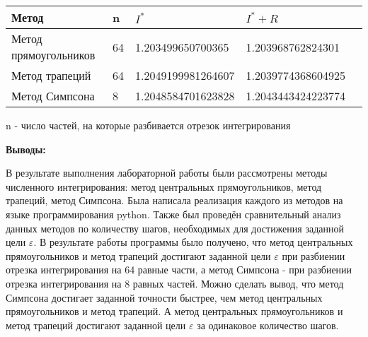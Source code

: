 \documentclass [12pt]{article}
\begin{document}
\begin{center}
\begin{tabular}{|l|l|l|l|l|}
    \hline
    Метод & n & $I^*$ & $I^* + R$\\
    \hline
    Метод прямоугольников & 64 & 1.203499650700365 & 1.203968762824301 \\
    \hline
    Метод трапеций & 64 & 1.2049199981264607 & 1.2039774368604925 \\
    \hline
    Метод Симпсона & 8 & 1.2048584701623828 & 1.2043443424223774 \\
    \hline
\end{tabular}
\end{center}

n - число частей, на которые разбивается отрезок интегрирования

\textbf{Выводы:}

В результате выполнения лабораторной работы были рассмотрены методы численного интегрирования: метод центральных прямоугольников, метод трапеций, метод Симпсона. Была написала реализация каждого из методов на языке программирования python. Также был проведён сравнительный анализ данных методов по количеству шагов, необходимых для достижения заданной цели $\varepsilon$.
В результате работы программы было получено, что метод центральных прямоугольников и метод трапеций достигают заданной цели $\varepsilon$ при разбиении отрезка интегрирования на 64 равные части, а метод Симпсона - при разбиении отрезка интегрирования на 8 равных частей.
Можно сделать вывод, что метод Симпсона достигает заданной точности быстрее, чем метод центральных прямоугольников и метод трапеций. А метод центральных прямоугольников и метод трапеций достигают заданной цели $\varepsilon$ за одинаковое количество шагов.
\end{document}

